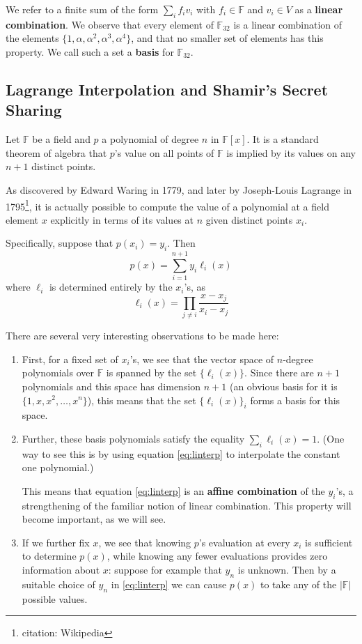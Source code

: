 \documentclass[letterpaper]{article}
\theoremstyle{xxx}
\theoremstyle{evil}
\theoremstyle{yyy}
\theoremstyle{plain}
\theoremstyle{zzz}
\newcommand{\fttwo}{\mathbb{F}_{32}}
\begin{document}
We refer to a finite sum of the form $\sum_i f_iv_i$ with $f_i\in \mathbb{F}$ and
$v_i\in V$ as a \textbf{linear combination}. We observe that every element
of $\fttwo$ is a linear combination of the elements $\{1,\alpha,\alpha^2,
\alpha^3,\alpha^4\}$, and that no smaller set of elements has this property.
We call such a set a \textbf{basis} for $\fttwo$.

\subsection{Lagrange Interpolation and Shamir's Secret Sharing\label{sec:sss}}

Let $\mathbb{F}$ be a field and $p$ a polynomial of degree $n$ in $\mathbb{F}[x]$. It is a
standard theorem of algebra that $p$'s value on all points of $\mathbb{F}$ is
implied by its values on any $n+1$ distinct points.

As discovered by Edward Waring in 1779, and later by Joseph-Louis Lagrange
in 1795\footnote{citation: Wikipedia}, it is actually possible to compute
the value of a polynomial at a field element $x$ explicitly in terms of
its values at $n$ given distinct points $x_i$.

Specifically, suppose that $p(x_i) = y_i$. Then
\begin{equation}
 p(x) = \sum_{i=1}^{n+1} y_i \ell_i(x) \label{eq:linterp}
\end{equation}
where $\ell_i$ is determined entirely by the $x_i$'s, as
\[ \ell_i(x) = \prod_{j\neq i} \frac{x - x_j}{x_i - x_j} \]

There are several very interesting observations to be made here:
\begin{enumerate}
\item First, for a fixed set of $x_i$'s, we see that the vector space of
$n$-degree polynomials over $\mathbb{F}$ is spanned by the set $\{\ell_i(x)\}$. Since
there are $n+1$ polynomials and this space has dimension $n+1$ (an obvious
basis for it is $\{ 1,x,x^2,\ldots,x^n\}$), this means that the set
$\{\ell_i(x)\}_i$ forms a basis for this space.
\item Further, these basis polynomials satisfy the equality
$\sum_i \ell_i(x) = 1$. (One way to see this is by using equation
\eqref{eq:linterp} to interpolate the constant one polynomial.)

This means that equation \eqref{eq:linterp} is an \textbf{affine
combination} of the $y_i$'s, a strengthening of the familiar notion
of linear combination. This property will become important, as we
will see.
\item If we further fix $x$, we see that knowing $p$'s evaluation at
every $x_i$ is sufficient to determine $p(x)$, while knowing any fewer
evaluations provides zero information about $x$: suppose for example
that $y_n$ is unknown. Then by a suitable choice of $y_n$ in \eqref{eq:linterp}
we can cause $p(x)$ to take any of the $|\mathbb{F}|$ possible values.
\end{enumerate}
\end{document}
